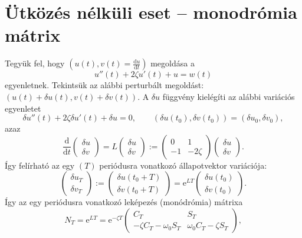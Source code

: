 \section{Ütközés nélküli eset -- monodrómia mátrix}
Tegyük fel, hogy $\left(u(t),v(t)=\frac{\mathrm{d}u}{\mathrm{d}t}\right)$ megoldása a 
\begin{equation}
u''(t)+2\zeta u'(t)+u=w(t)
\end{equation}
egyenletnek. Tekintsük az alábbi perturbált megoldást: $\left(u(t)+\delta u(t),v(t)+\delta v(t)\right)$. A $\delta u$ függvény kielégíti az alábbi variációs egyenletet
\begin{equation}
\delta u''(t)+2\zeta \delta u'(t)+\delta u=0,\qquad \left(\delta u(t_0),\delta v(t_0) \right)=\left(\delta u_0,\delta v_0 \right),
\end{equation}
azaz
\begin{equation}
\frac{\mathrm{d}}{\mathrm{d}t}\begin{pmatrix}
\delta u\\ \delta v
\end{pmatrix}=L\begin{pmatrix}
\delta u\\ \delta v
\end{pmatrix}:=\begin{pmatrix}
0 & 1 \\
-1 & -2\zeta
\end{pmatrix}\begin{pmatrix}
\delta u\\ \delta v
\end{pmatrix}.
\end{equation}
Így felírható az egy $(T)$ periódusra vonatkozó állapotvektor variációja:
\begin{equation}
\begin{pmatrix}
\delta u_T\\ \delta v_T
\end{pmatrix}:=
\begin{pmatrix}
\delta u(t_0+T)\\
\delta v(t_0+T)
\end{pmatrix}
=\mathrm{e}^{LT}\begin{pmatrix}
\delta u(t_0)\\ \delta v(t_0)
\end{pmatrix}.
\end{equation}
Így az egy periódusra vonatkozó leképezés (monódrómia) mátrixa
\begin{equation}\label{eq:Nt}
N_T=\mathrm{e}^{LT}=\mathrm{e}^{-\zeta T}\begin{pmatrix}
C_T & S_T\\
-\zeta C_T-\omega_0S_T & \omega_0C_T-\zeta S_T
\end{pmatrix},
\end{equation}
